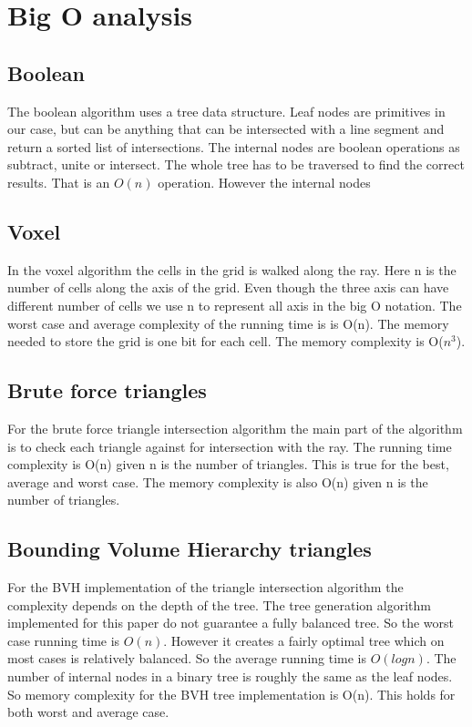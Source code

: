 \documentclass[11pt,twoside,a4paper]{report}
\begin{document}


\section{Big O analysis}
\label{section:results_big_O}

\subsection{Boolean}
The boolean algorithm uses a tree data structure. Leaf nodes are primitives in our case, but can be anything that can be intersected with a line segment and return a sorted list of intersections. The internal nodes are boolean operations as subtract, unite or intersect. The whole tree has to be traversed to find the correct results. That is an $O(n)$ operation. However the internal nodes 
    
\subsection{Voxel}
In the voxel algorithm the cells in the grid is walked along the ray. Here n is the number of cells along the axis of the grid. Even though the three axis can have different number of cells we use n to represent all axis in the big O notation. The worst case and average complexity of the running time is is O(n). The memory needed to store the grid is one bit for each cell. The memory complexity is O($n^3$).


\subsection{Brute force triangles}
For the brute force triangle intersection algorithm the main part of the algorithm is to check each triangle against for intersection with the ray. The running time complexity is O(n) given n is the number of triangles. This is true for the best, average and worst case. The memory complexity is also O(n) given n is the number of triangles.

\subsection{Bounding Volume Hierarchy triangles}
For the BVH implementation of the triangle intersection algorithm the complexity depends on the depth of the tree. The tree generation algorithm implemented for this paper do not guarantee a fully balanced tree. So the worst case running time is $O(n)$. However it creates a fairly optimal tree which on most cases is relatively balanced. So the average running time is $O(log n)$. The number of internal nodes in a binary tree is roughly the same as the leaf nodes. So memory complexity for the BVH tree implementation is O(n). This holds for both worst and average case.
\end{document}
